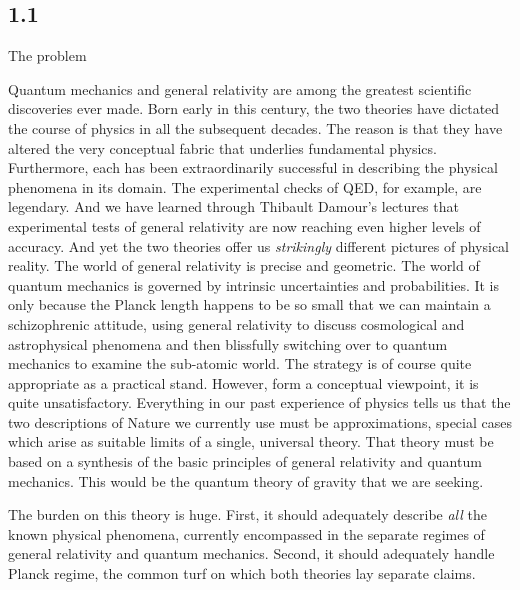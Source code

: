 \subsection{1.1}{The problem}%

Quantum mechanics and general relativity are among the greatest scientific
discoveries ever made. Born early in this century, the two theories
have dictated the course of physics in all the subsequent decades. The
reason is that they have altered the very conceptual fabric that
underlies fundamental physics. Furthermore,
each has been extraordinarily successful in describing the physical phenomena
in its domain. The experimental checks of QED, for example, are legendary. And
we have learned through Thibault Damour's lectures that experimental tests of
general relativity are now reaching even higher levels of accuracy. And yet
the two theories offer us  {\it strikingly} different pictures of
physical reality. The world of general relativity is precise
and geometric. The world of quantum mechanics is governed by intrinsic
uncertainties and probabilities. It is only because the Planck length happens
to be so small that we can maintain a schizophrenic attitude, using general
relativity to discuss cosmological and astrophysical phenomena and then
blissfully switching over to quantum mechanics to examine the sub-atomic
world. The strategy is of course quite appropriate as a practical stand.
However, form a conceptual viewpoint, it is quite unsatisfactory. Everything
in our past experience of physics tells us that the two descriptions of Nature
we currently use must be approximations, special cases which arise as
suitable limits of a single, universal theory. That theory must be based
on a synthesis of the basic principles of general relativity and quantum
mechanics. This would be the quantum theory of gravity that we are
seeking.

The burden on this theory is huge. First, it should adequately describe
{\it all} the known physical phenomena, currently encompassed in the
separate regimes of general relativity and quantum mechanics. Second,
it should adequately handle Planck regime, the common turf on which both
theories lay separate claims.

